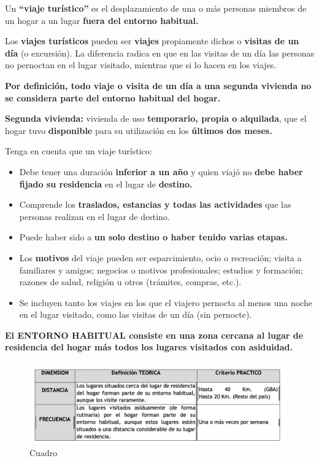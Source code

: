 \documentclass[
  openany]{book}
\begin{document}
Un \textbf{``viaje turístico''} es el desplazamiento de una o más personas miembros de un hogar a un lugar \textbf{fuera del entorno habitual.}

Los \textbf{viajes turísticos} pueden ser \textbf{viajes} propiamente dichos o \textbf{visitas de un día} (o excursión). La diferencia radica en que en las visitas de un día las personas no pernoctan en el lugar visitado, mientras que si lo hacen en los viajes.

\textbf{Por definición, todo viaje o visita de un día a una segunda vivienda no se considera parte del entorno habitual del hogar.}

\textbf{Segunda vivienda:} vivienda de uso \textbf{temporario, propia o alquilada}, que el hogar tuvo \textbf{disponible} para su utilización en los \textbf{últimos dos meses.}

Tenga en cuenta que un viaje turístico:

\begin{itemize}
\item
  Debe tener una duración \textbf{inferior a un año} y quien viajó no \textbf{debe haber fijado su residencia} en el lugar de \textbf{destino.}
\item
  Comprende los \textbf{traslados, estancias y todas las actividades} que las personas realizan en el lugar de destino.
\item
  Puede haber sido a \textbf{un solo destino o haber tenido varias etapas.}
\item
  Los \textbf{motivos} del viaje pueden ser esparcimiento, ocio o recreación; visita a familiares y amigos; negocios o motivos profesionales; estudios y formación; razones de salud, religión u otros (trámites, compras, etc.).
\item
  Se incluyen tanto los viajes en los que el viajero pernocta al menos una noche en el lugar visitado, como las visitas de un día (sin pernocte).
\end{itemize}

\textbf{El ENTORNO HABITUAL consiste en una zona cercana al lugar de residencia del hogar más todos los lugares visitados con asiduidad.}

\begin{figure}

{\centering \includegraphics[width=1\linewidth]{imagenes/figura6-21} 

}

\caption{Cuadro}\label{fig:Cuadr}
\end{figure}
\end{document}
